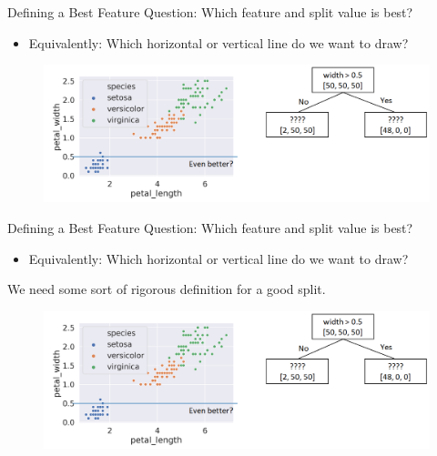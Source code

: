\documentclass[aspectratio=169]{../latex_main/tntbeamer}  %
\begin{document}
	\begin{frame}{Defining a Best Feature}
	    Question: Which feature and split value is best?
	    \begin{itemize}
	        \item  Equivalently: Which horizontal or vertical line do we want to draw?
	    \end{itemize}
	    \begin{figure}
	        \centering
	        \includegraphics[scale=.4]{figure_tree/Bild45}
	    \end{figure}
	\end{frame}
	
	
	\begin{frame}{Defining a Best Feature}
	    Question: Which feature and split value is best?
	    \begin{itemize}
	        \item  Equivalently: Which horizontal or vertical line do we want to draw?
	    \end{itemize}
	    \alert{We need some sort of rigorous definition for a good split.}
	    \begin{figure}
	        \centering
	        \includegraphics[scale=.4]{figure_tree/Bild45}
	    \end{figure}
	\end{frame}
	
\end{document}
